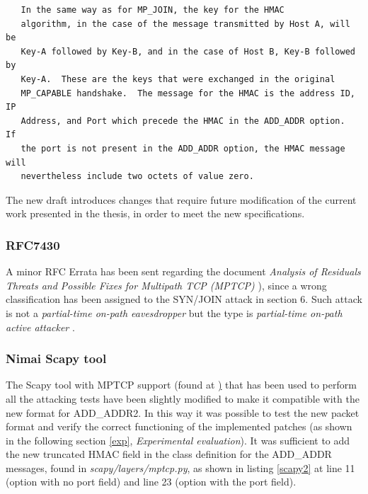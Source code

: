 \begin{verbatim}
   In the same way as for MP_JOIN, the key for the HMAC
   algorithm, in the case of the message transmitted by Host A, will be
   Key-A followed by Key-B, and in the case of Host B, Key-B followed by
   Key-A.  These are the keys that were exchanged in the original
   MP_CAPABLE handshake.  The message for the HMAC is the address ID, IP
   Address, and Port which precede the HMAC in the ADD_ADDR option.  If
   the port is not present in the ADD_ADDR option, the HMAC message will
   nevertheless include two octets of value zero.
\end{verbatim}

The new draft introduces changes that require future modification of the current work presented in the thesis, in order to meet the new specifications.

\subsubsection{RFC7430}
A minor RFC Errata has been sent regarding the document \textit{Analysis of Residuals Threats and Possible Fixes for Multipath TCP (MPTCP)} \cite{rfc7430}), since a wrong classification has been assigned to the SYN/JOIN attack in section 6. Such attack is not a \textit{partial-time on-path eavesdropper} but the type is \textit{partial-time on-path active attacker} \cite{errata}.

\subsubsection{Nimai Scapy tool}
The Scapy tool with MPTCP support (found at \href{https://github.com/nimai/mptcp-scapy}) that has been used to perform all the attacking tests have been slightly modified to make it compatible with the new format for ADD\_ADDR2. In this way it was possible to test the new packet format and verify the correct functioning of the implemented patches (as shown in the following section \ref{exp}, \textit{Experimental evaluation}). It was sufficient to add the new truncated HMAC field in the class definition for the ADD\_ADDR messages, found in \textit{scapy/layers/mptcp.py}, as shown in listing \ref{scapy2} at line 11 (option with no port field) and line 23 (option with the port field).

